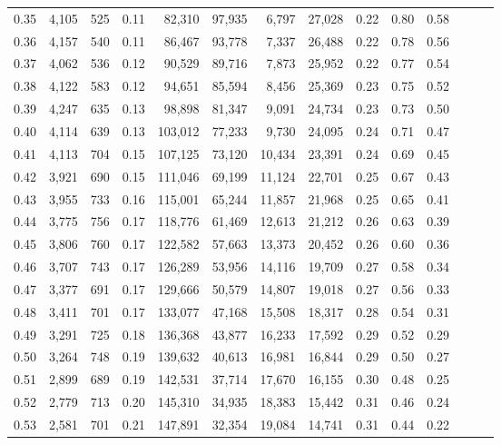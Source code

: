 \begin{tabular}{rrrrrrrrrrrrrr}
0.35 &  4,105 &  525 &  0.11 &   82,310 &   97,935 &   6,797 &  27,028 &  0.22 &  0.80 &      0.58 \\
0.36 &  4,157 &  540 &  0.11 &   86,467 &   93,778 &   7,337 &  26,488 &  0.22 &  0.78 &      0.56 \\
0.37 &  4,062 &  536 &  0.12 &   90,529 &   89,716 &   7,873 &  25,952 &  0.22 &  0.77 &      0.54 \\
0.38 &  4,122 &  583 &  0.12 &   94,651 &   85,594 &   8,456 &  25,369 &  0.23 &  0.75 &      0.52 \\
0.39 &  4,247 &  635 &  0.13 &   98,898 &   81,347 &   9,091 &  24,734 &  0.23 &  0.73 &      0.50 \\
0.40 &  4,114 &  639 &  0.13 &  103,012 &   77,233 &   9,730 &  24,095 &  0.24 &  0.71 &      0.47 \\
0.41 &  4,113 &  704 &  0.15 &  107,125 &   73,120 &  10,434 &  23,391 &  0.24 &  0.69 &      0.45 \\
0.42 &  3,921 &  690 &  0.15 &  111,046 &   69,199 &  11,124 &  22,701 &  0.25 &  0.67 &      0.43 \\
0.43 &  3,955 &  733 &  0.16 &  115,001 &   65,244 &  11,857 &  21,968 &  0.25 &  0.65 &      0.41 \\
0.44 &  3,775 &  756 &  0.17 &  118,776 &   61,469 &  12,613 &  21,212 &  0.26 &  0.63 &      0.39 \\
0.45 &  3,806 &  760 &  0.17 &  122,582 &   57,663 &  13,373 &  20,452 &  0.26 &  0.60 &      0.36 \\
0.46 &  3,707 &  743 &  0.17 &  126,289 &   53,956 &  14,116 &  19,709 &  0.27 &  0.58 &      0.34 \\
0.47 &  3,377 &  691 &  0.17 &  129,666 &   50,579 &  14,807 &  19,018 &  0.27 &  0.56 &      0.33 \\
0.48 &  3,411 &  701 &  0.17 &  133,077 &   47,168 &  15,508 &  18,317 &  0.28 &  0.54 &      0.31 \\
0.49 &  3,291 &  725 &  0.18 &  136,368 &   43,877 &  16,233 &  17,592 &  0.29 &  0.52 &      0.29 \\
0.50 &  3,264 &  748 &  0.19 &  139,632 &   40,613 &  16,981 &  16,844 &  0.29 &  0.50 &      0.27 \\
0.51 &  2,899 &  689 &  0.19 &  142,531 &   37,714 &  17,670 &  16,155 &  0.30 &  0.48 &      0.25 \\
0.52 &  2,779 &  713 &  0.20 &  145,310 &   34,935 &  18,383 &  15,442 &  0.31 &  0.46 &      0.24 \\
0.53 &  2,581 &  701 &  0.21 &  147,891 &   32,354 &  19,084 &  14,741 &  0.31 &  0.44 &      0.22 \\

\end{tabular}
